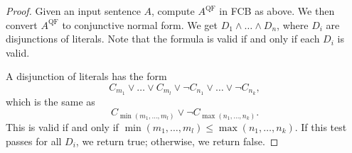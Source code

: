 \begin{proof}
  Given an input sentence $A$, compute $A^{\text{QF}}$ in FCB as above.
  We then convert $A^{\text{QF}}$ to conjunctive normal form.
  We get $D_1 \land \ldots \land D_n$, where $D_i$ are disjunctions of literals.
  Note that the formula is valid if and only if each $D_i$ is valid.

  A disjunction of literals has the form
  \[
	C_{m_1} \lor \ldots \lor C_{m_l} \lor \lnot C_{n_1} \lor \ldots \lor \lnot
	C_{n_k},
  \]
  which is the same as
  \[
	C_{\min(m_1, \ldots, m_l)} \lor \lnot C_{\max(n_1, \ldots, n_k)}.
  \]
  This is valid if and only if $\min(m_1, \ldots, m_l) \le \max(n_1, \ldots,
  n_k)$.
  If this test passes for all $D_i$, we return true; otherwise, we return false.
\end{proof}


